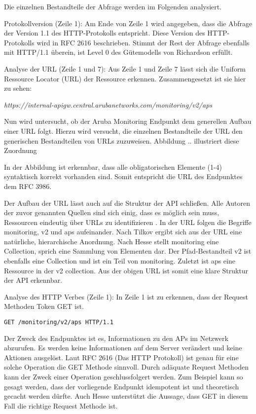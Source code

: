 Die einzelnen Bestandteile der Abfrage werden im Folgenden analysiert.

Protokollversion (Zeile 1): Am Ende von Zeile 1 wird angegeben, dass die Abfrage der Version 1.1 des HTTP-Protokolls entspricht. Diese Version des HTTP-Protokolls wird in RFC 2616 beschrieben. Stimmt der Rest der Abfrage ebenfalls mit HTTP/1.1 überein, ist Level 0 des Gütemodells von Richardson erfüllt.

Analyse der URL (Zeile 1 und 7): Aus Zeile 1 und Zeile 7 lässt sich die Uniform Ressource Locator (URL) der Ressource erkennen. Zusammengesetzt ist sie hier zu sehen:

\emph{https://internal-apigw.central.arubanetworks.com/monitoring/v2/aps}

Nun wird untersucht, ob der Aruba Monitoring Endpunkt dem generellen Aufbau einer URL folgt. Hierzu wird versucht, die einzelnen Bestandteile der URL den generischen Bestandteilen von URLs zuzuweisen. Abbildung .. illustriert diese Zuordnung

In der Abbildung ist erkennbar, dass alle obligatorischen Elemente (1-4) syntaktisch korrekt vorhanden sind. Somit entspricht die URL des Endpunktes dem RFC 3986.

Der Aufbau der URL lässt auch auf die Struktur der API schließen. Alle Autoren der zuvor genannten Quellen sind sich einig, dass es möglich sein muss, Ressourcen eindeutig über URLs zu identifizieren . In der URL folgen die Begriffe monitoring, v2 und aps aufeinander. Nach Tilkov ergibt sich aus der URL eine natürliche, hierarchische Anordnung. Nach Hesse stellt monitoring eine Collection, sprich eine Sammlung von Elementen dar. Der Pfad-Bestandteil v2 ist ebenfalls eine Collection und ist ein Teil von monitoring. Zuletzt ist aps eine Ressource in der v2 collection. Aus der obigen URL ist somit eine klare Struktur der API erkennbar. 

Analyse des HTTP Verbes (Zeile 1): In Zeile 1 ist zu erkennen, dass der Request Methoden Token GET ist. 

\begin{lstlisting}
GET /monitoring/v2/aps HTTP/1.1
\end{lstlisting}

Der Zweck des Endpunktes ist es, Informationen zu den APs im Netzwerk abzurufen. Es werden keine Informationen auf dem Server verändert und keine Aktionen ausgelöst. Laut RFC 2616 (Das HTTP Protokoll) ist genau für eine solche Operation die GET Methode sinnvoll. Durch adäquate Request Methoden kann der Zweck einer Operation geschlussfolgert werden. Zum Beispiel kann so gesagt werden, dass der vorliegende Endpunkt idempotent ist und theoretisch gecacht werden dürfte. Auch Hesse unterstützt die Aussage, dass GET in diesem Fall die richtige Request Methode ist.

